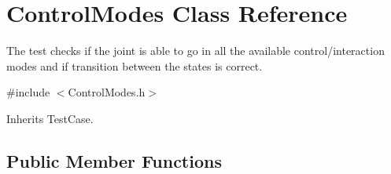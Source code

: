\section{Control\+Modes Class Reference}
\label{classControlModes}


The test checks if the joint is able to go in all the available control/interaction modes and if transition between the states is correct.  




{\ttfamily \#include $<$Control\+Modes.\+h$>$}



Inherits Test\+Case.

\subsection*{Public Member Functions}
